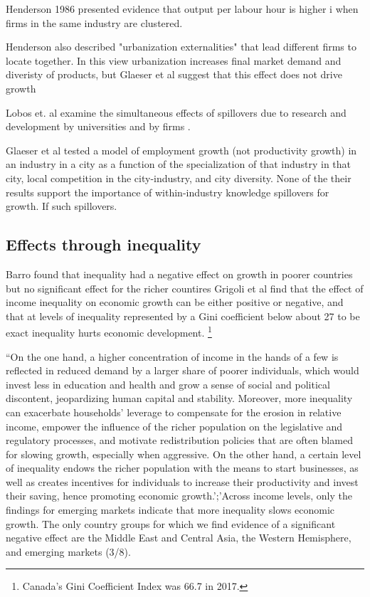 Henderson 1986 presented evidence that output per labour hour is higher i when firms in the same industry are clustered.

Henderson also described "urbanization externalities" that lead different firms to locate together. In this view urbanization increases final market demand and diveristy of products, but Glaeser et al suggest that this effect does not drive growth

Lobos et. al examine the simultaneous effects of spillovers due to research and development by universities and by firms \cite{belderbosWhatSpilloversUniversities2022}.

Glaeser et al \cite{glaeserGrowthCities1991} tested a model  of employment growth (not productivity growth) in an industry in a city as a function of the specialization of that industry in that city, local competition in the city-industry, and city diversity. None of the their results  support the importance
of within-industry knowledge spillovers for growth. If such spillovers. %

\subsection{Effects through inequality}
Barro \cite{barroInequalityGrowthInvestment1999} found that inequality had a negative effect on growth in poorer countries but no significant effect for the richer countires
Grigoli et al find  that the effect of income inequality on economic growth can be either positive or negative, and that at levels  of inequality  represented by a Gini coefficient below about 27  to be exact inequality hurts economic development. \footnote{Canada's Gini Coefficient Index was 66.7 in 2017.}\cite{grigoliInequalityGrowthHeterogeneous2016} 

 ``On the one hand, a higher concentration of income in the hands of a few is reflected in reduced demand by a larger share of poorer individuals, which would invest less in education and health and grow a sense of social and political discontent, jeopardizing human capital and stability. Moreover, more inequality can exacerbate households’ leverage to compensate for the erosion in relative income, empower the influence of the richer population on the legislative and regulatory processes, and motivate redistribution policies that are often blamed for slowing growth, especially when aggressive. On the other hand, a certain level of inequality endows the richer population with the means to start businesses, as well as creates incentives for individuals to increase their productivity and invest their saving, hence promoting economic growth.';'Across income levels, only the findings for emerging markets indicate that more inequality slows economic growth. The only country groups for which we find evidence of a significant negative effect are the Middle East and Central Asia, the Western Hemisphere, and emerging markets (3/8).

